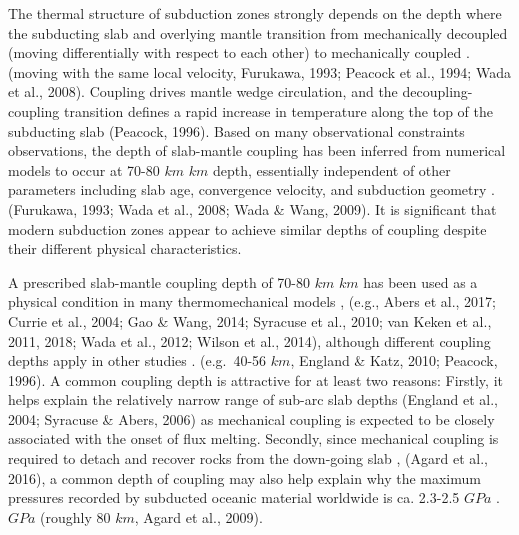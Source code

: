 \documentclass[draft,linenumbers]{agujournal2018} %
\providecommand{\DIFaddtex}[1]{{\protect\color{blue} \sf #1}} %
\providecommand{\DIFdeltex}[1]{{\protect\color{red} \scriptsize #1}} %
\providecommand{\DIFaddbegin}{} %
\providecommand{\DIFaddend}{} %
\providecommand{\DIFdelbegin}{} %
\providecommand{\DIFdelend}{} %
\providecommand{\DIFadd}[1]{\texorpdfstring{\DIFaddtex{#1}}{#1}} %
\providecommand{\DIFdel}[1]{\texorpdfstring{\DIFdeltex{#1}}{}} %
\newcommand{\DIFscaledelfig}{0.3}
\newlength{\DIFdelgraphicswidth} %
\newlength{\DIFdelgraphicsheight} %
\newcommand{\DIFaddincludegraphics}[2][]{{\color{blue}\fbox{\DIFOincludegraphics[#1]{#2}}}} %
\newcommand{\DIFdelincludegraphics}[2][]{%
\sbox{\DIFdelgraphicsbox}{\DIFOincludegraphics[#1]{#2}}%
\settoboxwidth{\DIFdelgraphicswidth}{\DIFdelgraphicsbox} %
\settoboxtotalheight{\DIFdelgraphicsheight}{\DIFdelgraphicsbox} %
\scalebox{\DIFscaledelfig}{%
\parbox[b]{\DIFdelgraphicswidth}{\usebox{\DIFdelgraphicsbox}\\[-\baselineskip] \rule{\DIFdelgraphicswidth}{0em}}\llap{\resizebox{\DIFdelgraphicswidth}{\DIFdelgraphicsheight}{%
\setlength{\unitlength}{\DIFdelgraphicswidth}%
\begin{picture}(1,1)%
\thicklines\linethickness{2pt} %
{\color[rgb]{1,0,0}\put(0,0){\framebox(1,1){}}}%
{\color[rgb]{1,0,0}\put(0,0){\line( 1,1){1}}}%
{\color[rgb]{1,0,0}\put(0,1){\line(1,-1){1}}}%
\end{picture}%
}\hspace*{3pt}}} %
} %
\DeclareRobustCommand{\DIFaddbegin}{\DIFOaddbegin \let\includegraphics\DIFaddincludegraphics} %
\DeclareRobustCommand{\DIFaddend}{\DIFOaddend \let\includegraphics\DIFOincludegraphics} %
\DeclareRobustCommand{\DIFdelbegin}{\DIFOdelbegin \let\includegraphics\DIFdelincludegraphics} %
\DeclareRobustCommand{\DIFdelend}{\DIFOaddend \let\includegraphics\DIFOincludegraphics} %
\begin{document}
\DIFaddend The thermal structure of subduction zones strongly depends on the depth
where the subducting slab and overlying mantle transition from
mechanically decoupled (moving differentially with respect to each
other) to mechanically coupled \DIFdelbegin %
\DIFdel{.}\DIFdelend \DIFaddbegin \DIFadd{(moving with the same local velocity,
Furukawa, 1993; Peacock et al., 1994; Wada et al., 2008). }\DIFaddend Coupling
drives mantle wedge circulation, and the decoupling-coupling transition
defines a rapid increase in temperature along the top of the subducting
slab \DIFdelbegin %
\DIFdelend \DIFaddbegin \DIFadd{(Peacock, 1996)}\DIFaddend . Based on many \DIFdelbegin \DIFdel{observational constraints }\DIFdelend \DIFaddbegin \DIFadd{observations, }\DIFaddend the depth of
slab-mantle coupling has been inferred from numerical models to occur at
70-80 \DIFdelbegin \DIFdel{$km$ }\DIFdelend \DIFaddbegin \DIFadd{\(km\) }\DIFaddend depth, essentially independent of other parameters
including slab age, convergence velocity, and subduction geometry
\DIFdelbegin %
\DIFdel{.}\DIFdelend \DIFaddbegin \DIFadd{(Furukawa, 1993; Wada et al., 2008; Wada \& Wang, 2009). }\DIFaddend It is
significant that modern subduction zones appear to achieve similar
depths of coupling despite their different physical characteristics.

A prescribed slab-mantle coupling depth of 70-80 \DIFdelbegin \DIFdel{$km$ }\DIFdelend \DIFaddbegin \DIFadd{\(km\) }\DIFaddend has been used as
a physical condition in many thermomechanical models \DIFdelbegin %
\DIFdel{, }\DIFdelend \DIFaddbegin \DIFadd{(e.g., Abers et
al., 2017; Currie et al., 2004; Gao \& Wang, 2014; Syracuse et al.,
2010; van Keken et al., 2011, 2018; Wada et al., 2012; Wilson et al.,
2014), }\DIFaddend although different coupling depths apply in other studies
\DIFdelbegin %
\DIFdel{.}\DIFdelend \DIFaddbegin \DIFadd{(e.g.~40-56 \(km\), England \& Katz, 2010; Peacock, 1996). }\DIFaddend A common
coupling depth is attractive for at least two reasons: Firstly, it helps
explain the relatively narrow range of sub-arc slab depths \DIFdelbegin %
\DIFdelend \DIFaddbegin \DIFadd{(England et
al., 2004; Syracuse \& Abers, 2006) }\DIFaddend as mechanical coupling is expected
to be closely associated with the onset of flux melting. Secondly, since
mechanical coupling is required to detach and recover rocks from the
down-going slab \DIFdelbegin %
\DIFdel{, }\DIFdelend \DIFaddbegin \DIFadd{(Agard et al., 2016), }\DIFaddend a common depth of coupling may
also help explain why the maximum pressures recorded by subducted
oceanic material worldwide is ca. 2.3-2.5 \DIFdelbegin \DIFdel{$GPa$  }%
\DIFdel{.}\DIFdelend \DIFaddbegin \DIFadd{\(GPa\) (roughly 80 \(km\),
Agard et al., 2009).
}\DIFaddend
\end{document}
